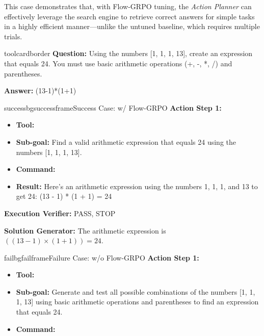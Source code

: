 This case demonstrates that, with Flow-GRPO tuning, the \textit{Action Planner} can effectively leverage the search engine to retrieve correct answers for simple tasks in a highly efficient manner—unlike the untuned baseline, which requires multiple trials.

\begin{custombox}[title=Example from \# GameOf24]{toolcardborder}
\textbf{Question:} Using the numbers [1, 1, 1, 13], create an expression that equals 24. You must use basic arithmetic operations (+, -, *, /) and parentheses.

\vspace{1em}

\textbf{Answer:} (13-1)*(1+1)
\end{custombox}

\begin{small}
\begin{center}

    \begin{casebox}{successbg}{successframe}{Success Case: \model w/ Flow-GRPO}
    \textbf{Action Step 1:}
    \begin{itemize}[nosep, leftmargin=*]
        \item \textbf{Tool:} 
        \item \textbf{Sub-goal:} Find a valid arithmetic expression that equals 24 using the numbers [1, 1, 1, 13].
        \item \textbf{Command:} 
        
        \item \textbf{Result:} Here's an arithmetic expression using the numbers 1, 1, 1, and 13 to get 24: (13 - 1) * (1 + 1) = 24
    \end{itemize}

    \vspace{1em}

    \textbf{Execution Verifier:} \textcolor{successframe}{PASS, STOP}

    \vspace{1em}

    \textbf{Solution Generator: }\textcolor{successframe}{The arithmetic expression is $((13 - 1) \times (1 + 1)) = 24$.}
    
\end{casebox}

\begin{casebox}{failbg}{failframe}{Failure Case: \model w/o Flow-GRPO}
    \textbf{Action Step 1:}
    \begin{itemize}[nosep, leftmargin=*]
        \item \textbf{Tool:} 
        \item \textbf{Sub-goal:} Generate and test all possible combinations of the numbers [1, 1, 1, 13] using basic arithmetic operations and parentheses to find an expression that equals 24.
        \item \textbf{Command:} 
        

\end{itemize}
\end{casebox}
\end{center}
\end{small}
